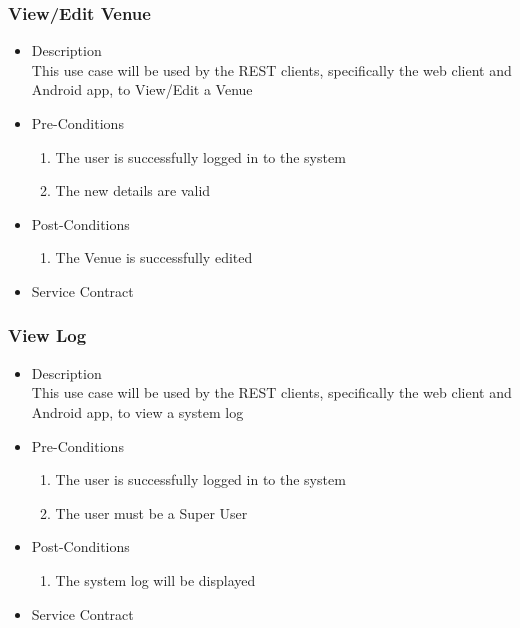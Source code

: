 \documentclass[a4paper,10pt]{article}
\begin{document}
\subsubsection{View/Edit Venue}
	\begin{itemize}
		\item Description\\
			This use case will be used by the REST clients, specifically the web client and Android app, to View/Edit a Venue
		\item Pre-Conditions
			\begin{enumerate}
				\item The user is successfully logged in to the system
				\item The new details are valid
			\end{enumerate}
		\item Post-Conditions
			\begin{enumerate}
				\item The Venue is successfully edited
						
			\end{enumerate}
		\item Service Contract
	\end{itemize}


\subsubsection{View Log}
	\begin{itemize}
		\item Description\\
			This use case will be used by the REST clients, specifically the web client and Android app, to view a system log
		\item Pre-Conditions
			\begin{enumerate}
				\item The user is successfully logged in to the system
				\item The user must be a Super User
			\end{enumerate}
		\item Post-Conditions
			\begin{enumerate}
				\item The system log will be displayed
				
						
			\end{enumerate}
		\item Service Contract
	\end{itemize}
\end{document}
